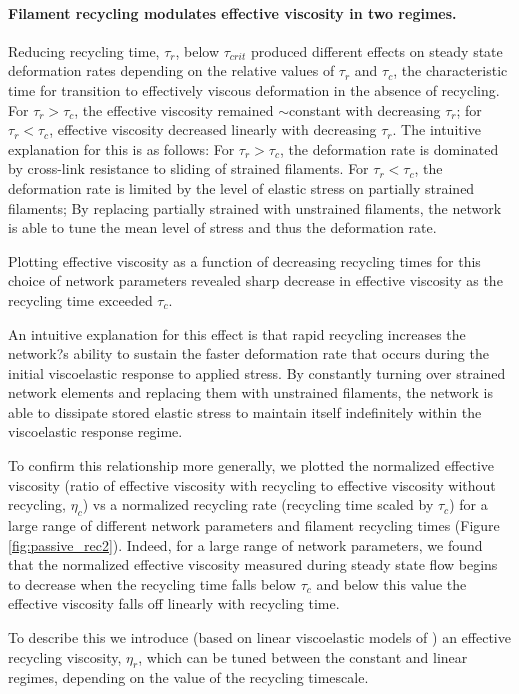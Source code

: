 \documentclass[10pt,letterpaper]{article}
\begin{document}
\paragraph{Filament recycling modulates effective viscosity in two regimes.}
Reducing recycling time, $\tau_r$, below $\tau_{crit}$ produced different effects on steady state deformation rates depending on the relative values of $\tau_r$ and $\tau_c$, the characteristic time for transition to effectively viscous deformation in the absence of recycling. For $\tau_r > \tau_c$, the effective viscosity remained $\sim$constant with decreasing $\tau_r$; for $\tau_r < \tau_c$, effective viscosity decreased linearly with decreasing $\tau_r$.  The intuitive explanation for this is as follows: For $\tau_r > \tau_c$, the deformation rate is dominated by cross-link resistance to sliding of strained filaments. For $\tau_r < \tau_c$, the deformation rate is limited by the level of elastic stress on partially strained filaments; By replacing partially strained with unstrained filaments, the network is able to tune the mean level of stress and thus the deformation rate.

Plotting effective viscosity as a function of decreasing recycling times for this choice of network parameters revealed sharp decrease in effective viscosity as the recycling time exceeded $\tau_c$.  

An intuitive explanation for this effect is that rapid recycling increases the network?s ability to sustain the faster deformation rate that occurs during the initial viscoelastic response to applied stress. By constantly turning over strained network elements and replacing them with unstrained filaments, the network is able to dissipate stored elastic stress to maintain itself indefinitely within the viscoelastic response regime.  

To confirm this relationship more generally, we plotted the normalized effective viscosity (ratio of effective viscosity with recycling to effective viscosity without recycling, $\eta_c$) vs a normalized recycling rate (recycling time scaled by $\tau_c$) for a large range of different network parameters and filament recycling times (Figure \ref{fig:passive_rec2}). Indeed, for a large range of network parameters, we found that the normalized effective viscosity measured during steady state flow begins to decrease when the recycling time falls below $\tau_c$ and below this value the effective viscosity falls off linearly with recycling time. 

To describe this we introduce (based on linear viscoelastic models of \cite{mccrum1997principles}) an effective recycling viscosity, $\eta_r$, which can be tuned between the constant and linear regimes, depending on the value of the recycling timescale.
\end{document}
